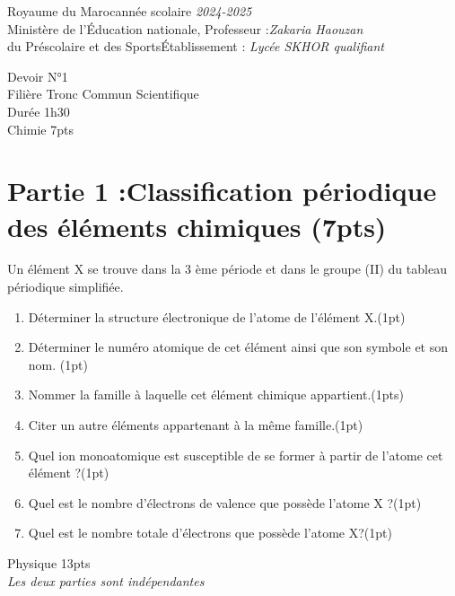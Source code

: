 \documentclass[12pt]{article}
\newcommand\headerMe[2]{\noindent{}#1\hfill#2}
\begin{document}
\headerMe{Royaume du Maroc}{année scolaire \emph{2024-2025}}\\
\headerMe{Ministère de l'Éducation nationale, }{  Professeur :\emph{Zakaria Haouzan}}\\
\headerMe{du Préscolaire et des Sports}{Établissement : \emph{Lycée SKHOR qualifiant}}\\

\begin{center}
Devoir  N°1 \\
   Filière Tronc Commun Scientifique\\
Durée 1h30
\\
    \vspace{.2cm}
\hrulefill
\Large{Chimie 7pts}
\hrulefill\\

\end{center}
 \section*{Partie 1 :Classification périodique des éléments chimiques \dotfill (7pts) }
Un élément X se trouve dans la 3 ème période et dans le groupe (II) du tableau périodique simplifiée.
\begin{enumerate}
    \item Déterminer la structure électronique de l'atome de l'élément X.\dotfill(1pt)

    \item Déterminer le numéro atomique de cet élément ainsi que son symbole et son nom. \dotfill(1pt)
    \item Nommer la famille à laquelle cet élément chimique appartient.\dotfill(1pts)
    \item Citer un autre éléments appartenant à la même famille.\dotfill(1pt)
 \item Quel ion monoatomique est susceptible de se former à partir de l’atome cet élément ?\dotfill(1pt)
 \item Quel est le nombre d'électrons de valence que possède l’atome X ?\dotfill(1pt)
 \item Quel est le nombre totale d'électrons que possède l’atome X?\dotfill(1pt)
\end{enumerate}

\begin{center}
\hrulefill
\Large{Physique 13pts}
\hrulefill\\
    \emph{Les deux parties sont indépendantes}
\end{center}
\end{document}
